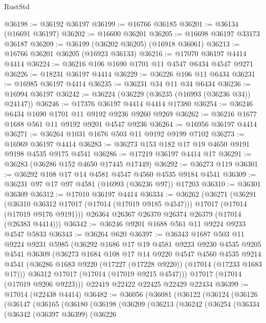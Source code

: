 \begin{lexlean}{RustStd}
\begin{coremodule}
@36198 := @36192 @36197
@36199 := @16766 @36185
@36201 := @36134 (@16691 @36197)
@36202 := @16600 @36201
@36205 := @16698 @36197 @33173 @36187
@36209 := @36199 (@36202 @36205) (@16918 @36061)
@36213 := @16766 @36201 @36205 (@16923 @36133)
@36216 := @17070 @36197 @4414 @4414
@36224 := @36216 @106 @1690 @1701 @11 @4547 @6434 @4547 @9271
@36226 := @18231 @36197 @4414
@36229 := @36226 @106 @11 @6434
@36231 := @16985 @36197 @4414
@36235 := @36231 @34 @11 @34 @6434
@36236 := @16994 @36197
@36242 := @36224 (@36229 (@36235 (@16993 (@36236 @34)) @24147))
@36246 := @17376 @36197 @4414 @4414 @17380
@36254 := @36246 @6434 @1690 @1701 @11 @9192 @9236 @9260 @9269
@36262 := @36216 @1677 @1688 @561 @11 @9192 @9201 @4547 @9236
@36264 := @16956 @36197 @4414
@36271 := @36264 @1031 @1676 @503 @11 @9192 @9199 @7102
@36273 := @16969 @36197 @4414
@36283 := @36273 @153 @182 @17 @19 @4650 @9191 @9198 @4535 @9175 @4541
@36286 := @17219 @36197 @4414 @17
@36291 := @36283 (@36286 @152 @4650 @17445 @17449)
@36292 := @36273 @119
@36301 := @36292 @108 @17 @14 @4581 @4547 @4560 @4535 @9184 @4541
@36309 := @36231 @97 @17 @97 @4581 (@16993 (@36236 @97)) @17203
@36310 := @36301 @36309
@36312 := @17010 @36197 @4414
@36334 := @36262
    (@36271
      (@36291
        (@36310 @36312 @17017 (@17014 (@17019 @9185 @4547)))
        @17017
        (@17014 (@17019 @9176 @9191)))
      @26364
      @26367
      @26370
      @26374
      @26379
      (@17014 (@26383 @4414)))
@36342 := @36246 @9201 @1688 @561 @11 @9224 @9233 @4547 @5833
@36343 := @36264 @620
@36397 := @36343
    @1687
    @503
    @11
    @9224
    @9231
    @5985
    (@36292
      @1686
      @17
      @19
      @4581
      @9223
      @9230
      @4535
      @9205
      @4541
      @36309
      (@36273
        @1684
        @108
        @17
        @14
        @9220
        @4547
        @4560
        @4535
        @9214
        @4541
        (@36286 @1683 @9220 (@17227 (@17228 @9220)) (@17014 (@17233 @1683 @17)))
        @36312
        @17017
        (@17014 (@17019 @9215 @4547)))
      @17017
      (@17014 (@17019 @9206 @9223)))
    @22419
    @22422
    @22425
    @22429
    @22434
@36399 := @17014 (@22438 @4414)
@36482 := @36056
    (@36081
      (@36122
        (@36124
          (@36126
            (@36147
              (@36165
                (@36180
                  (@36198
                    (@36209
                      (@36213
                        (@36242
                          (@36254
                            (@36334
                              (@36342
                                (@36397 @36399)
                                (@36226

\end{coremodule}
\end{lexlean}
